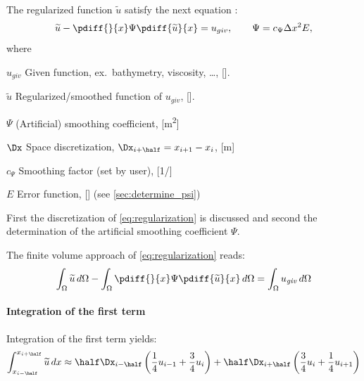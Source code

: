 The regularized function $\widetilde u$ satisfy the next equation \citep[eq.\ 6]{Borsboom1998}:
\begin{align}
    \widetilde u - \pdiff{}{x} \Psi \pdiff{\widetilde u}{x} = u_{giv}, \qquad \Psi = c_{\Psi}\Delta x^2 E, \label{eq:regularization}
\end{align}
where
\begin{symbollist}
    \item[$u_{giv}$] Given function, ex.\ bathymetry, viscosity, \ldots, [\si{\cdot}].
    \item[$\widetilde u$] Regularized/smoothed function of $u_{giv}$, [\si{\cdot}].
    \item[$\Psi$] (Artificial) smoothing coefficient, [\si{\square\metre}]
    \item[$\Dx$] Space discretization, $\Dx_{i+\half} = x_{i+1} - x_{i}$, [\si{\metre}]
    \item[$c_{\Psi}$] Smoothing factor (set by user), [\si{1/\cdot}]
    \item[$E$] Error function, [\si{\cdot}] (see \autoref{sec:determine_psi})
\end{symbollist}


First the discretization of \autoref{eq:regularization} is discussed and second the determination of the artificial smoothing coefficient $\Psi$.

The finite volume approach of \autoref{eq:regularization} reads:
\begin{align}
\int_\Omega \widetilde u\, d\Omega  - \int_\Omega \pdiff{}{x}  \Psi \pdiff{\widetilde u}{x}\, d\Omega  = \int_\Omega  u_{\it{giv}}\, d\Omega \label{eq:1d_regularization}
\end{align}
\paragraph*{Integration of the first term}
Integration of the first term yields: %
\begin{align}
\int_{x_{i-\half}}^{x_{i+\half}} \widetilde u\, dx \approx
\half \Dx_{i-\half} \left( \frac{1}{4} u_{i-1} + \frac{3}{4} u_{i} \right)  +
\half \Dx_{i+\half} \left( \frac{3}{4} u_{i} + \frac{1}{4} u_{i+1} \right)
\end{align}
